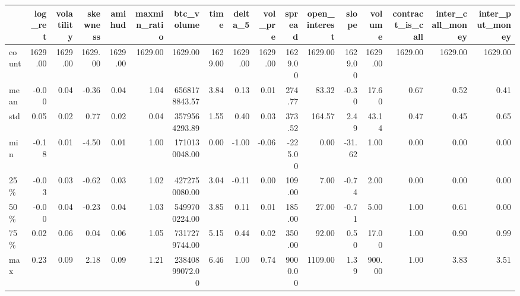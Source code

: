 \begin{tabular}{lrrrrrrrrrrrrrrrr}
\toprule
{} &  log\_ret &  volatility &  skewness &  amihud &  maxmin\_ratio &     btc\_volume &    time &  delta\_5 &  vol\_pre &  spread &  open\_interest &   slope &  volume &  contract\_is\_call &  inter\_call\_money &  inter\_put\_money \\
\midrule
count &  1629.00 &     1629.00 &   1629.00 & 1629.00 &       1629.00 &        1629.00 & 1629.00 &  1629.00 &  1629.00 & 1629.00 &        1629.00 & 1629.00 & 1629.00 &           1629.00 &           1629.00 &          1629.00 \\
mean  &    -0.00 &        0.04 &     -0.36 &    0.04 &          1.04 &  6568178843.57 &    3.84 &     0.13 &     0.01 &  274.77 &          83.32 &   -0.30 &   17.60 &              0.67 &              0.52 &             0.41 \\
std   &     0.05 &        0.02 &      0.77 &    0.02 &          0.04 &  3579564293.89 &    1.55 &     0.40 &     0.03 &  373.52 &         164.57 &    2.49 &   43.14 &              0.47 &              0.45 &             0.65 \\
min   &    -0.18 &        0.01 &     -4.50 &    0.01 &          1.00 &  1710130048.00 &    0.00 &    -1.00 &    -0.06 & -225.00 &           0.00 &  -31.62 &    1.00 &              0.00 &              0.00 &             0.00 \\
25\%   &    -0.03 &        0.03 &     -0.62 &    0.03 &          1.02 &  4272750080.00 &    3.04 &    -0.11 &     0.00 &  109.00 &           7.00 &   -0.74 &    2.00 &              0.00 &              0.00 &             0.00 \\
50\%   &    -0.00 &        0.04 &     -0.23 &    0.04 &          1.03 &  5499700224.00 &    3.85 &     0.11 &     0.01 &  185.00 &          27.00 &   -0.71 &    5.00 &              1.00 &              0.61 &             0.00 \\
75\%   &     0.02 &        0.06 &      0.04 &    0.06 &          1.05 &  7317279744.00 &    5.15 &     0.44 &     0.02 &  350.00 &          92.00 &    0.50 &   17.00 &              1.00 &              0.90 &             0.99 \\
max   &     0.23 &        0.09 &      2.18 &    0.09 &          1.21 & 23840899072.00 &    6.46 &     1.00 &     0.74 & 9000.00 &        1109.00 &    1.39 &  900.00 &              1.00 &              3.83 &             3.51 \\
\bottomrule
\end{tabular}
